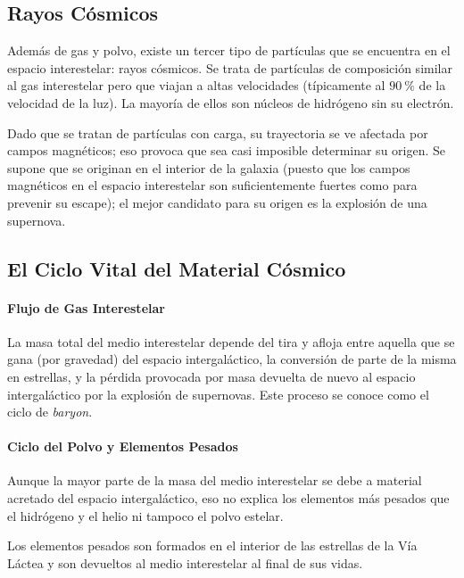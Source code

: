 \documentclass{tufte-handout}
\begin{document}
\subsection{Rayos Cósmicos}

Además de gas y polvo, existe un tercer tipo de partículas que se encuentra en el espacio interestelar: rayos cósmicos. Se trata de partículas de composición similar al gas interestelar pero que viajan a altas velocidades (típicamente al $90~\%$ de la velocidad de la luz). La mayoría de ellos son núcleos de hidrógeno sin su electrón.

Dado que se tratan de partículas con carga, su trayectoria se ve afectada por campos magnéticos; eso provoca que sea casi imposible determinar su origen. Se supone que se originan en el interior de la galaxia (puesto que los campos magnéticos en el espacio interestelar son suficientemente fuertes como para prevenir su escape); el mejor candidato para su origen es la explosión de una supernova.

\subsection{El Ciclo Vital del Material Cósmico}

\paragraph{Flujo de Gas Interestelar}

La masa total del medio interestelar depende del tira y afloja entre aquella que se gana (por gravedad) del espacio intergaláctico, la conversión de parte de la misma en estrellas, y la pérdida provocada por masa devuelta de nuevo al espacio intergaláctico por la explosión de supernovas. Este proceso se conoce como el ciclo de \emph{baryon}.

\paragraph{Ciclo del Polvo y Elementos Pesados}

Aunque la mayor parte de la masa del medio interestelar se debe a material acretado del espacio intergaláctico, eso no explica los elementos más pesados que el hidrógeno y el helio ni tampoco el polvo estelar.

Los elementos pesados son formados en el interior de las estrellas de la Vía Láctea y son devueltos al medio interestelar al final de sus vidas.
\end{document}
